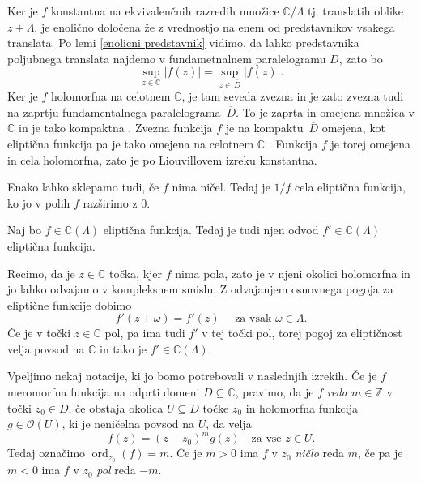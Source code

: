 \documentclass[mat1]{fmfdelo}
\numberwithin{equation}{section}
\newcommand{\Z}{\mathbb Z}
\newcommand{\C}{\mathbb C}
\newcommand{\elf}{\C(\Lambda)}
\newcommand{\ord}[2]{\operatorname{ord}_{#1}(#2)}
\newcommand{\hol}[1]{\mathcal{O}(#1)}
\newcommand{\olsi}[1]{\,\overline{\!{#1}}} %
\theoremstyle{definition}
\begin{document}
\begin{dokaz}
    Ker je $f$ konstantna na ekvivalenčnih razredih množice $\C/\Lambda$ tj. translatih oblike $z + \Lambda$, je enolično določena že z vrednostjo na enem od predstavnikov vsakega translata. Po lemi \ref{enolicni predstavnik} vidimo, da lahko predstavnika poljubnega translata najdemo v fundametnalnem paralelogramu $D$, zato bo 
    \[
        \sup_{z \in \C} \left\lvert f(z) \right\rvert = \sup_{z \in \olsi{D}} \left\lvert f(z) \right\rvert.
    \]
    Ker je $f$ holomorfna na celotnem $\C$, je tam seveda zvezna in je zato zvezna tudi na zaprtju fundamentalnega paralelograma $\olsi{D}$. To je zaprta in omejena množica v $\C$ in je tako kompaktna \cite[Trditev 2.22]{MrcunTop}. Zvezna funkcija $f$ je na kompaktu $\olsi{D}$ omejena, kot eliptična funkcija pa je tako omejena na celotnem $\C$ \cite[Posledica 2.28]{MrcunTop}. Funkcija $f$ je torej omejena in cela holomorfna, zato je po Liouvillovem izreku konstantna.  
\end{dokaz}

\begin{opomba}
    Enako lahko sklepamo tudi, če $f$ nima ničel. Tedaj je $1/f$ cela eliptična funkcija, ko jo v polih $f$ razširimo z $0$.
\end{opomba}

\begin{lema}
    \label{odvod el. funkcije}
    Naj bo $f \in \elf$ eliptična funkcija. Tedaj je tudi njen odvod $f' \in \elf$ eliptična funkcija.
\end{lema}

\begin{dokaz}
    Recimo, da je $z \in \C$ točka, kjer $f$ nima pola, zato je v njeni okolici holomorfna in jo lahko odvajamo v kompleksnem smislu. Z odvajanjem osnovnega pogoja za eliptične funkcije dobimo
    \[
        f'(z + \omega) = f'(z) \quad \text{ za vsak $\omega \in \Lambda$.}
    \]
    Če je v točki $z \in \C$ pol, pa ima tudi $f'$ v tej točki pol, torej pogoj za eliptičnost velja povsod na $\C$ in tako je $f' \in \elf$.
\end{dokaz}

Vpeljimo nekaj notacije, ki jo bomo potrebovali v naslednjih izrekih. Če je $f$ meromorfna funkcija na odprti domeni $D \subseteq \C$, pravimo, da je $f$ \emph{reda $m \in \Z$} v točki $z_0 \in D$, če obstaja okolica $U \subseteq D$ točke $z_0$ in holomorfna funkcija $g \in \hol{U}$, ki je neničelna povsod na $U$, da velja 
\[
    f(z) = (z - z_0)^m g(z) \quad \text{za vse $z \in U$.}  
\]   
Tedaj označimo $\ord{z_0}{f} = m$. Če je $m > 0$ ima $f$ v $z_0$ \emph{ničlo} reda $m$, če pa je $m < 0$ ima $f$ v $z_0$ \emph{pol} reda $-m$.
\end{document}
